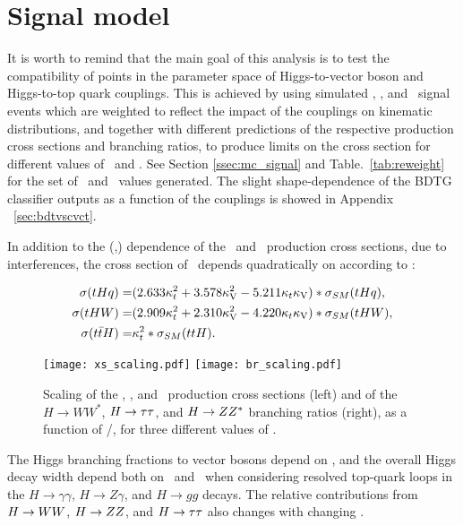 
\section{Signal model}

It is worth to remind that the main goal of this analysis is to test the compatibility of points in the parameter space of Higgs-to-vector boson and Higgs-to-top quark couplings. This is achieved by using simulated \tHq, \tHW, and \ttH\ signal events which are weighted to reflect the impact of the couplings on kinematic distributions, and together with different predictions of the respective production cross sections and branching ratios, to produce limits on the cross section for different values of \CV\ and \Ct. See Section \ref{ssec:mc_signal} and Table.~\ref{tab:reweight} for the set of \Ct\ and \CV\ values generated. The slight shape-dependence of the BDTG classifier outputs as a function of the couplings is showed in Appendix ~\ref{sec:bdtvscvct}.

In addition to the (\Ct,\CV) dependence of the \tHq\ and \tHW\ production cross sections, due to interferences, the cross section of \ttH\ depends quadratically on \Ct according to \cite{}:

\begin{align}
\sigma(tHq) =& (2.633 \kappa_t^2 + 3.578 \kappa_\text{V}^2 - 5.211 \kappa_t\kappa_\text{V}) * \sigma_{SM}(tHq),\\
\sigma(tHW) =& (2.909 \kappa_t^2 + 2.310 \kappa_\text{V}^2 - 4.220 \kappa_t\kappa_\text{V}) * \sigma_{SM}(tHW),\\
\sigma(t\bar{t}H) =& \kappa_t^2 * \sigma_{SM}(ttH).
\end{align}

\begin{figure} [!h]
 \centering
  \texttt{[image: xs\_scaling.pdf]}
  \texttt{[image: br\_scaling.pdf]}
\caption[Scaling of the \tHq, \tHW, and \ttH\ production cross section  with \Ct/\CV.]{Scaling of the \tHq, \tHW, and \ttH\ production cross sections (left) and of the $H\to WW^*$, $H\to\tau\tau$, and $H\to ZZ^*$ branching ratios (right), as a function of \Ct/\CV, for three different values of \CV.}
\label{fig:xsbrscalings}
\end{figure}

The Higgs branching fractions to vector bosons depend on \CV, and the overall Higgs decay width depend both on \Ct\ and \CV\ when considering resolved top-quark loops in the $H\to\gamma\gamma$, $H\to Z\gamma$, and $H\to gg$ decays. The relative contributions from $ H\to WW$, $H\to ZZ$, and $H\to\tau\tau$ also changes with changing \CV.

